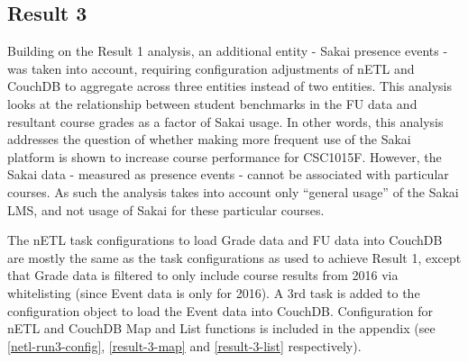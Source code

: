 \subsection{Result 3}
Building on the Result 1 analysis, an additional entity - Sakai presence events - was taken into account, requiring configuration adjustments of nETL and CouchDB to aggregate across three entities instead of two entities. This analysis looks at the relationship between student benchmarks in the FU data and resultant course grades as a factor of Sakai usage. In other words, this analysis addresses the question of whether making more frequent use of the Sakai platform is shown to increase course performance for CSC1015F. However, the Sakai data - measured as presence events - cannot be associated with particular courses. As such the analysis takes into account only ``general usage'' of the Sakai LMS, and not usage of Sakai for these particular courses.

The nETL task configurations to load Grade data and FU data into CouchDB are mostly the same as the task configurations as used to achieve Result 1, except that Grade data is filtered to only include course results from 2016 via whitelisting (since Event data is only for 2016). A 3rd task is added to the configuration object to load the Event data into CouchDB. Configuration for nETL and CouchDB Map and List functions is included in the appendix (see \ref{netl-run3-config}, \ref{result-3-map} and \ref{result-3-list} respectively).

